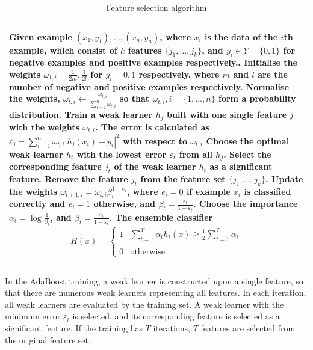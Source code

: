 \documentclass[a4paper,10pt]{article}
\begin{document}
\begin{table}[ht]
\caption{Feature selection algorithm}
\begin{tabular}{p{\columnwidth}}
\hline
\begin{algorithmic}[1]
{
\STATE Given example $(x_{1},y_{1}),\ldots,(x_{n},y_{n})$, where $x_{i}$ is the data of the $i$th example, which consist of $k$ features $\{j_{1},\ldots,j_{k}\}$, and $y_{i} \in Y=\{0,1\}$ for negative examples and positive examples respectively..
\STATE Initialise the weights $\omega_{1,i}=\frac{1}{2m},\frac{1}{2l}$ for $y_{i}=0,1$ respectively, where $m$ and $l$ are the number of negative and positive examples respectively.
\FOR{$t=1,\ldots,T$}
	\STATE Normalise the weights, $\omega_{t,i}\leftarrow\frac{\omega_{t,i}}{\sum_{i=1}^{n}\omega_{t,i}}$ so that $\omega_{t,i},i=\{1,\ldots,n\}$ form a probability distribution.
	\FORALL{$\{j_{1},\ldots,j_{k}\}$}
		\STATE Train a  weak learner $h_{j}$ built with one single feature $j$ with the weights $\omega_{t,i}$.
		\STATE The error is calculated as $\varepsilon_{j}=\sum_{i=1}^{n}\omega_{t,i}|h_{j}(x_{i})-y_{i}|^{2}$ with respect to $\omega_{t,i}$
	\ENDFOR
	\STATE Choose the optimal weak learner $h_{t}$ with the lowest error $\varepsilon_{t}$ from all $h_{j}$.
	\STATE Select the corresponding feature $j_{t}$ of the weak learner $h_{t}$ as a significant feature.
	\STATE Remove the feature $j_{t}$ from the feature set $\{j_{1},\ldots,j_{k}\}$.
	\STATE Update the weights $\omega_{t+1,i}=\omega_{t,i}\beta_{t}^{1-e_{i}}$, where $e_{i}=0$ if example $x_{i}$ is classified correctly and $e_{i}=1$ otherwise, and $\beta_{t}=\frac{\varepsilon_{t}}{1-\varepsilon_{t}}$.
	\STATE Choose the importance $\alpha_{t}=\log\frac{1}{\beta_{t}}$, and $\beta_{t}=\frac{\varepsilon_{t}}{1-\varepsilon_{t}}$.
\ENDFOR
\STATE The ensemble classifier
\begin{displaymath}
 H(x)  = 
		\left\{
		 \begin{array}{ll}
		  1 & \sum_{t=1}^{T}\alpha_{t}h_{t}(x) \geq \frac{1}{2}\sum_{t=1}^{T}\alpha_{t}\\
			\\
		  0 & \textrm{otherwise}
		 \end{array}
		\right. 
\end{displaymath}
}
\end{algorithmic}\\
\hline
\end{tabular}
\label{tab:binarygaborboosting}
\end{table}

In the AdaBoost training, a weak learner is constructed upon a single feature, so that there are numerous weak learners representing all features. In each iteration, all weak learners are evaluated by the training set. A weak learner with the minimum error $\varepsilon_{t}$ is selected, and its corresponding feature is selected as a significant feature. If the training has $T$ iterations, $T$ features are selected from the original feature set.
\end{document}
